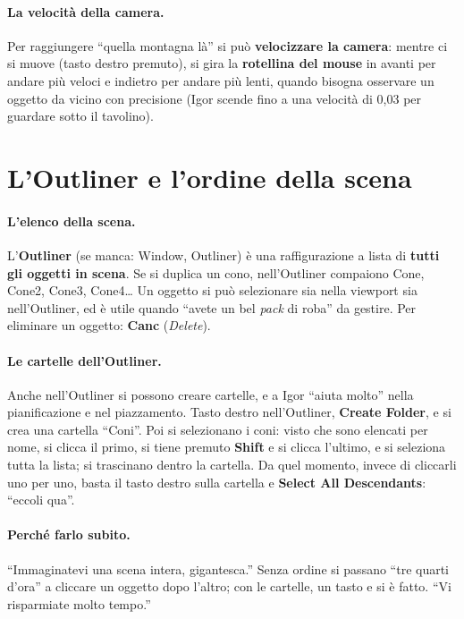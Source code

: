 \paragraph{La velocità della camera.} Per raggiungere ``quella montagna là'' si può
\textbf{velocizzare la camera}: mentre ci si muove (tasto destro premuto), si gira la
\textbf{rotellina del mouse} in avanti per andare più veloci e indietro per andare più
lenti, quando bisogna osservare un oggetto da vicino con precisione (Igor scende fino a
una velocità di 0,03 per guardare sotto il tavolino).

\section{L'Outliner e l'ordine della scena}
\label{ue1:sec:outliner}

\paragraph{L'elenco della scena.} L'\textbf{Outliner} (se manca: Window, Outliner) è una
raffigurazione a lista di \textbf{tutti gli oggetti in scena}. Se si duplica un cono,
nell'Outliner compaiono Cone, Cone2, Cone3, Cone4\ldots{} Un oggetto si può selezionare
sia nella viewport sia nell'Outliner, ed è utile quando ``avete un bel \emph{pack} di
roba'' da gestire. Per eliminare un oggetto: \textbf{Canc} (\emph{Delete}).

\paragraph{Le cartelle dell'Outliner.} Anche nell'Outliner si possono creare cartelle, e
a Igor ``aiuta molto'' nella pianificazione e nel piazzamento. Tasto destro
nell'Outliner, \textbf{Create Folder}, e si crea una cartella ``Coni''. Poi si
selezionano i coni: visto che sono elencati per nome, si clicca il primo, si tiene
premuto \textbf{Shift} e si clicca l'ultimo, e si seleziona tutta la lista; si
trascinano dentro la cartella. Da quel momento, invece di cliccarli uno per uno, basta
il tasto destro sulla cartella e \textbf{Select All Descendants}: ``eccoli qua''.

\paragraph{Perché farlo subito.} ``Immaginatevi una scena intera, gigantesca.'' Senza
ordine si passano ``tre quarti d'ora'' a cliccare un oggetto dopo l'altro; con le
cartelle, un tasto e si è fatto. ``Vi risparmiate molto tempo.''

